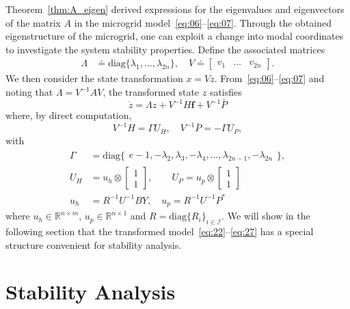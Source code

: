 \documentclass[letter, 10pt, conference]{ieeeconf}
\newcommand{\R}{\mathbb{R}}
\newcommand{\I}{\mathcal{I}}
\newcommand{\diag}{\mathrm{diag}}
\newcommand{\1}{\mathbf{1}}
\newcommand{\0}{\mathbf{0}}
\begin{document}
{Theorem~\ref{thm:A_eigen} derived expressions for the eigenvalues and
eigenvectors of the matrix $A$ in the microgrid
model~\eqref{eq:06}--\eqref{eq:07}. 
Through the obtained eigenstructure of the microgrid, one can exploit
a change into modal coordinates to investigate the system stability
properties. Define the associated matrices
\begin{align*}
	\Lambda &\doteq \diag \{ \lambda_1,\dots,\lambda_{2n} \}, \quad
	V \doteq \begin{bmatrix} v_1 & \dots & v_{2n} \end{bmatrix}.
\end{align*} 
We then consider the state transformation $x=Vz$.
From~\eqref{eq:06}--\eqref{eq:07} and noting that $\Lambda=V^{-1}AV$,
the transformed state $z$ satisfies
\begin{equation}
	\label{eq:22}
	\dot{z}=\Lambda z + V^{-1} H \mathbf{f} + V^{-1} \bar{P}
\end{equation}
where, by direct computation, \begin{equation}
	\label{eq:23}
	V^{-1}H = \Gamma U_H, \quad
	V^{-1}\bar{P} = -\Gamma U_P,
\end{equation}
with
\begin{align}
	\label{eq:24}
	\Gamma&=\mathrm{diag}\{
	  \begin{smallmatrix}
	     e-1,-\lambda_2,\lambda_3,-\lambda_4,\dots,
			\lambda_{2n-1},-\lambda_{2n}
	  \end{smallmatrix}\}, \\
	\label{eq:25}
	U_H&= u_h \otimes \left[\begin{smallmatrix} 1 \\ 1 \end{smallmatrix}\right]
, \qquad 
U_P= u_p \otimes \left[\begin{smallmatrix} 1 \\ 1 \end{smallmatrix}\right]
\\
	\label{eq:27}
    u_h &= R^{-1} U^{-1} B Y
, \quad
u_p = R^{-1} U^{-1} P^*
\end{align}
where $u_h\in \R^{n \times m}$, $u_p\in \R^{n \times 1}$ and
$R=\mathrm{diag}\{R_i\}_{i\in\I}$.
We will show in the following section that the transformed
model~\eqref{eq:22}--\eqref{eq:27} has a special structure convenient for stability analysis.



\section{Stability Analysis}

}
\end{document}
